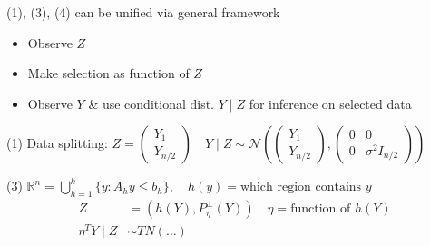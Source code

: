 \vspace{0.5cm}
\noindent (1), (3), (4) can be unified via general framework
\begin{itemize}
    \item Observe $Z$
    \item Make selection as function of $Z$
    \item Observe $Y$ \& use conditional dist. $Y \mid Z$ for inference on selected data
\end{itemize}

\vspace{0.5cm}
\noindent (1) Data splitting: $Z = \begin{pmatrix} Y_1 \\ Y_{n/2} \end{pmatrix} \quad Y \mid Z \sim \mathcal{N} \left( \begin{pmatrix} Y_1 \\ Y_{n/2} \end{pmatrix}, \begin{pmatrix} 0 & 0 \\ 0 & \sigma^2 I_{n/2} \end{pmatrix} \right)$

\vspace{0.5cm}
\noindent (3) $\mathbb{R}^n = \bigcup_{h=1}^k \{ y : A_h y \le b_h \}, \quad h(y) = \text{which region contains } y$
\begin{align*}
    Z &= (h(Y), P_{\eta}^\perp (Y)) \quad \eta = \text{function of } h(Y) \\
    \eta^T Y \mid Z &\sim TN(\dots)
\end{align*}
